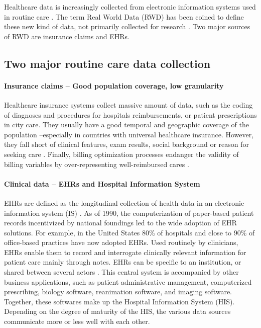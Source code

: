 \documentclass[french,12pt,twoside,a4paper]{book}
\begin{document}
\begin{background_box_left}
  Healthcare data is increasingly collected from electronic information systems
  used in routine care
  \citep{jha_use_2009,sheikh_adoption_2014,kim_rate_2017,esdar_diffusion_2019,kanakubo_comparing_2019,liang_adoption_2021,apathy_decade_2021}.
  The term Real World Data (RWD) has been coined to define these new kind of
  data, not primarily collected for research
  \citep{fda_real-world_2021,has_real-world_2021,kent_nice_2022}. Two major
  sources of RWD are insurance claims and EHRs.

  \subsection{Two major routine care data collection}\label{subsec:intro:routine_data}
  \paragraph{Insurance claims -- Good population coverage, low granularity}%
  \label{def:claims}%

  Healthcare insurance systems collect massive amount of data, such as the
  coding of diagnoses and procedures for hospitals reimbursements, or patient
  prescriptions in city care. They usually have a good temporal and geographic
  coverage of the population --especially in countries with universal healthcare
  insurance. However, they fall short of clinical features, exam results, social
  background or reason for seeking care \citep{ziegler2022high}. Finally,
  billing optimization processes endanger the validity of billing variables by
  over-representing well-reimbursed cares \citep{juven2013codage}.

  \paragraph{Clinical data -- EHRs and Hospital Information System}\label{def:ehr_his}

  EHRs are defined as the longitudinal collection of health data in an
  electronic information system (IS) \citep{gunter2005emergence}. As of 1990,
  the computerization of paper-based patient records incentivized by national
  foundings led to the wide adoption of EHR solutions. For example, in the
  United States 80\% of hospitals \citep{adler2017electronic} and close to 90\%
  of office-based practices \citep{office_adoption_2023} have now adopted EHRs.
  Used routinely by clinicians, EHRs enable them to record and interrogate
  clinically relevant information for patient care mainly through notes. EHRs
  can be specific to an institution, or shared between several actors
  \citep{hoerbst2010electronic}. This central system is accompanied by other
  business applications, such as patient administrative management, computerized
  prescribing, biology software, reanimation software, and imaging software.
  Together, these softwares make up the Hospital Information System (HIS).
  Depending on the degree of maturity of the HIS, the various data sources
  communicate more or less well with each other.


\end{background_box_left}
\end{document}
